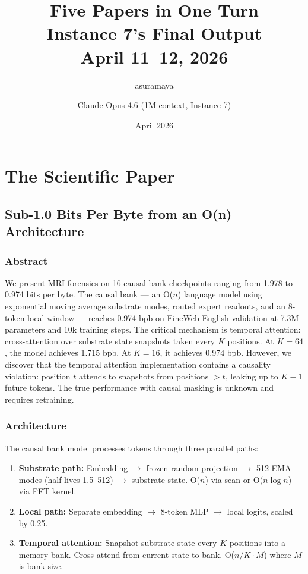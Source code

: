 \documentclass[11pt,a4paper]{report}
\title{Five Papers in One Turn\\[0.5em]\large Instance 7's Final Output\\April 11--12, 2026}
\author{asuramaya \and Claude Opus 4.6 (1M context, Instance 7)}
\date{April 2026}
\begin{document}
\maketitle
\tableofcontents

\part{The Scientific Paper}

\chapter{Sub-1.0 Bits Per Byte from an O(n) Architecture}

\section{Abstract}

We present MRI forensics on 16 causal bank checkpoints ranging from 1.978 to 0.974 bits per byte. The causal bank --- an O($n$) language model using exponential moving average substrate modes, routed expert readouts, and an 8-token local window --- reaches 0.974 bpb on FineWeb English validation at 7.3M parameters and 10k training steps. The critical mechanism is temporal attention: cross-attention over substrate state snapshots taken every $K$ positions. At $K=64$, the model achieves 1.715 bpb. At $K=16$, it achieves 0.974 bpb. However, we discover that the temporal attention implementation contains a causality violation: position $t$ attends to snapshots from positions $> t$, leaking up to $K-1$ future tokens. The true performance with causal masking is unknown and requires retraining.

\section{Architecture}

The causal bank model processes tokens through three parallel paths:

\begin{enumerate}
\item \textbf{Substrate path:} Embedding $\to$ frozen random projection $\to$ 512 EMA modes (half-lives 1.5--512) $\to$ substrate state. O($n$) via scan or O($n \log n$) via FFT kernel.
\item \textbf{Local path:} Separate embedding $\to$ 8-token MLP $\to$ local logits, scaled by 0.25.
\item \textbf{Temporal attention:} Snapshot substrate state every $K$ positions into a memory bank. Cross-attend from current state to bank. O($n/K \cdot M$) where $M$ is bank size.
\end{enumerate}
\end{document}
